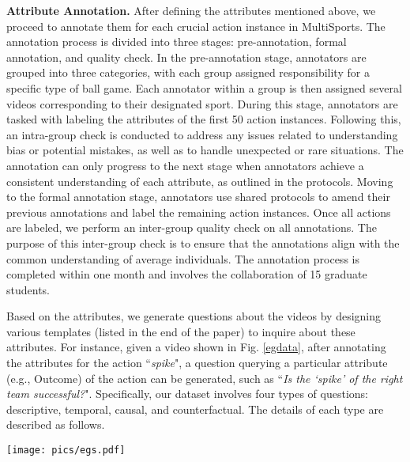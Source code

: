 \noindent\textbf{Attribute Annotation.}
After defining the attributes mentioned above, we proceed to annotate them for each crucial action instance in MultiSports. The annotation process is divided into three stages: pre-annotation, formal annotation, and quality check.
In the pre-annotation stage, annotators are grouped into three categories, with each group assigned responsibility for a specific type of ball game. Each annotator within a group is then assigned several videos corresponding to their designated sport. During this stage, annotators are tasked with labeling the attributes of the first 50 action instances. Following this, an intra-group check is conducted to address any issues related to understanding bias or potential mistakes, as well as to handle unexpected or rare situations. The annotation can only progress to the next stage when annotators achieve a consistent understanding of each attribute, as outlined in the protocols.
Moving to the formal annotation stage, annotators use shared protocols to amend their previous annotations and label the remaining action instances. Once all actions are labeled, we perform an inter-group quality check on all annotations. The purpose of this inter-group check is to ensure that the annotations align with the common understanding of average individuals.
The annotation process is completed within one month and involves the collaboration of 15 graduate students.

Based on the attributes, we generate questions about the videos by designing various templates (listed in the end of the paper) to inquire about these attributes. For instance, given a video shown in Fig. \ref{egdata}, after annotating the attributes for the action ``\textit{spike}", a question querying a particular attribute (e.g., Outcome) of the action can be generated, such as ``\textit{Is the `spike' of the right team successful?}".
Specifically, our dataset involves four types of questions: descriptive, temporal, causal, and counterfactual. The details of each type are described as follows.

\begin{figure*}[tbp]
\centering
\texttt{[image: pics/egs.pdf]}
\caption{Example of Sports-QA: The actions in the green boxes (such as ``\textit{2-point shot}") are the query actions, while the actions in the yellow boxes (such as ``\textit{block}") represent the effects. For ball games, annotators provide attribute labels, and we generate QA pairs based on these attributes. In gymnastics, we generate QA pairs using annotations from MultiSports/FineGym.
}
\label{egdata}
\end{figure*}

